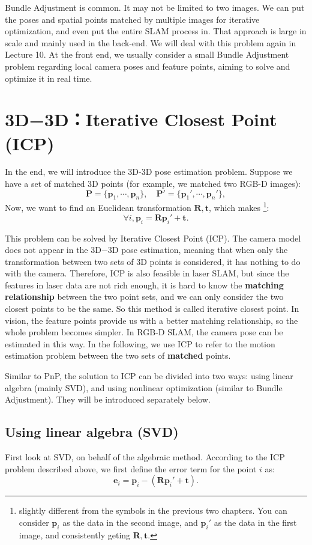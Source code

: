 Bundle Adjustment is common. It may not be limited to two images. We can put the poses and spatial points matched by multiple images for iterative optimization, and even put the entire SLAM process in. That approach is large in scale and mainly used in the back-end. We will deal with this problem again in Lecture 10. At the front end, we usually consider a small Bundle Adjustment problem regarding local camera poses and feature points, aiming to solve and optimize it in real time.

\section{3D−3D：Iterative Closest Point (ICP)}
In the end, we will introduce the 3D-3D pose estimation problem. Suppose we have a set of matched 3D points (for example, we matched two RGB-D images):
\[
\mathbf{P} = \{ \mathbf{p}_1, \cdots, \mathbf{p}_n \}, \quad \mathbf{P}' = \{ \mathbf{p}_1', \cdots, \mathbf{p}_n'\},
\]
Now, we want to find an Euclidean transformation $\mathbf{R}, \mathbf{t}$, which makes \footnote{slightly different from the symbols in the previous two chapters. You can consider $\mathbf{p}_i$ as the data in the second image, and $\mathbf{p}_i'$ as the data in the first image, and consistently geting $ \mathbf{R},\mathbf{t}$.}:
\[
\forall i, \mathbf{p}_i = \mathbf{R} \mathbf{p}_i' + \mathbf{t}.
\]

This problem can be solved by Iterative Closest Point (ICP). The camera model does not appear in the 3D−3D pose estimation, meaning that when only the transformation between two sets of 3D points is considered, it has nothing to do with the camera. Therefore, ICP is also feasible in laser SLAM, but since the features in laser data are not rich enough, it is hard to know the \textbf{matching relationship} between the two point sets, and we can only consider the two closest points to be the same. So this method is called iterative closest point. In vision, the feature points provide us with a better matching relationship, so the whole problem becomes simpler. In RGB-D SLAM, the camera pose can be estimated in this way. In the following, we use ICP to refer to the motion estimation problem between the two sets of \textbf{matched} points.

Similar to PnP, the solution to ICP can be divided into two ways: using linear algebra (mainly SVD), and using nonlinear optimization (similar to Bundle Adjustment). They will be introduced separately below.

\subsection{Using linear algebra (SVD)}
First look at SVD, on behalf of the algebraic method. According to the ICP problem described above, we first define the error term for the point $i$ as:
\begin{equation}
\mathbf{e}_i = \mathbf{p}_i - (\mathbf{R} \mathbf{p}_i' + \mathbf{t} ) .
\end{equation}

